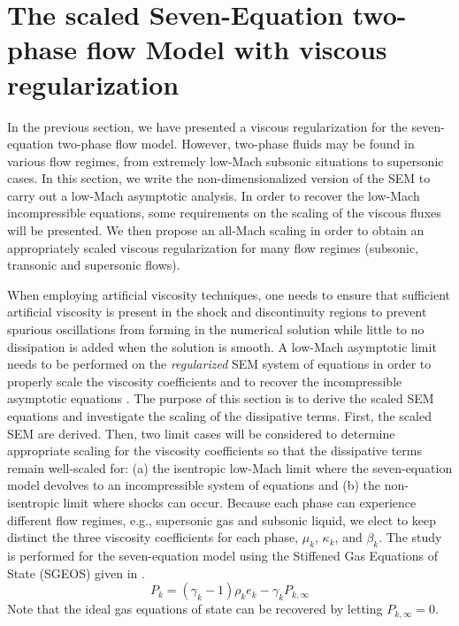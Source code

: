 \section{The scaled Seven-Equation two-phase flow Model with viscous regularization}\label{sec:low-Mach}
%
In the previous section, we have presented a viscous regularization for the seven-equation two-phase flow model.  However,
two-phase fluids may be found in various flow regimes, from extremely low-Mach subsonic situations to supersonic cases.
In this section, we write the non-dimensionalized version of the SEM to carry out a low-Mach asymptotic analysis. In order to 
recover the low-Mach incompressible equations, some requirements on the scaling of the viscous fluxes will be presented.  
We then propose an all-Mach scaling in order to obtain an appropriately scaled viscous regularization for many flow regimes
(subsonic, transonic and supersonic flows).

When employing artificial viscosity techniques, one needs to ensure that sufficient artificial viscosity is present in the shock 
and discontinuity regions to prevent spurious oscillations from forming in the numerical solution while little to no dissipation 
is added when the solution is smooth.
A low-Mach asymptotic limit needs to be performed on the {\it regularized} SEM system of equations in order to properly scale the viscosity 
coefficients and to recover the incompressible asymptotic equations \cite{LowMach1,LowMach2,LowMach3}. The purpose of this section is to 
derive the scaled SEM equations and investigate the scaling of the dissipative terms. 
First, the scaled SEM are derived. Then, two limit cases will be considered to determine 
appropriate scaling for the viscosity coefficients so that the dissipative terms remain well-scaled for: 
(a) the isentropic low-Mach limit where the seven-equation model devolves to an incompressible system of 
equations and (b) the non-isentropic limit where shocks can occur. 
Because each phase can experience different flow regimes, e.g., supersonic gas and subsonic liquid, we elect to keep distinct the three viscosity 
coefficients for each phase, $\mu_k$, $\kappa_k$, and $\beta_k$. The study is performed for the seven-equation model using the Stiffened Gas 
Equations of State (SGEOS) \cite{SGEOS} given in .
%
\begin{equation}\label{eq:SGEOS_bis}
P_k = \left( \gamma_k-1 \right) \rho_k e_k - \gamma_k P_{k,\infty}
\end{equation}
Note that the ideal gas equations of state can be recovered by letting $P_{k,\infty}=0$.

